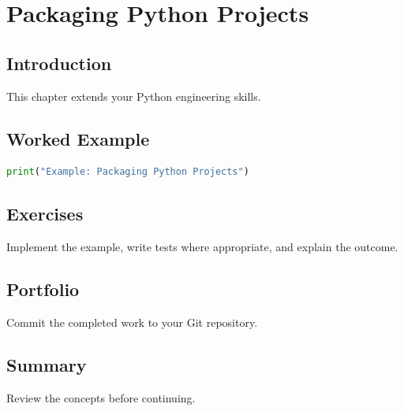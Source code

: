 \chapter{Packaging Python Projects}
\label{chap:vol3-23}



\section{Introduction}
This chapter extends your Python engineering skills.

\section{Worked Example}
\begin{lstlisting}[language=Python]
print("Example: Packaging Python Projects")
\end{lstlisting}

\section{Exercises}
\begin{exercise}
Implement the example, write tests where appropriate, and explain the outcome.
\end{exercise}

\section{Portfolio}
Commit the completed work to your Git repository.

\section{Summary}
Review the concepts before continuing.

